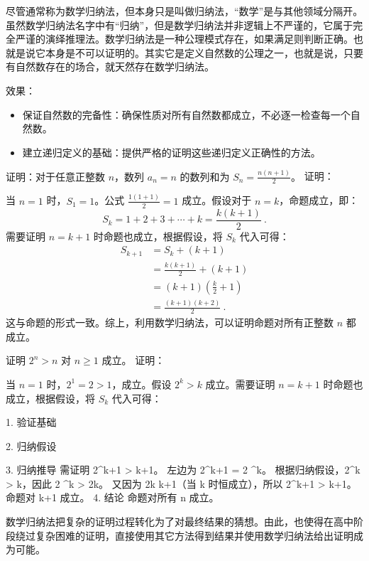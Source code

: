 尽管通常称为数学归纳法，但本身只是叫做归纳法，“数学”是与其他领域分隔开。虽然数学归纳法名字中有“归纳”，但是数学归纳法并非逻辑上不严谨的，它属于完全严谨的演绎推理法。数学归纳法是一种公理模式存在，如果满足则判断正确。也就是说它本身是不可以证明的。其实它是定义自然数的公理之一，也就是说，只要有自然数存在的场合，就天然存在数学归纳法。

效果：
\begin{itemize}
\item 保证自然数的完备性：确保性质对所有自然数都成立，不必逐一检查每一个自然数。
\item 建立递归定义的基础：提供严格的证明这些递归定义正确性的方法。
\end{itemize}

\begin{example}{证明：对于任意正整数 $n$，数列 $a_n=n$ 的数列和为 $S_n = \frac{n(n+1)}{2}$。}
证明：

当 $n = 1$ 时，$S_1 = 1$。公式 $\frac{1(1+1)}{2} = 1$ 成立。假设对于 $n = k$，命题成立，即：
\begin{equation}
S_k = 1 + 2 + 3 + \cdots + k = \frac{k(k+1)}{2}~.
\end{equation}
需要证明 $n = k+1$ 时命题也成立，根据假设，将 $S_k$ 代入可得：
\begin{equation}
\begin{aligned}
S_{k+1} &= S_k + (k+1)\\
&= \frac{k(k+1)}{2} + (k+1)\\
&= (k+1)\left(\frac{k}{2} +1\right)\\
&= \frac{(k+1)(k+2)}{2}~.
\end{aligned}
\end{equation}
这与命题的形式一致。综上，利用数学归纳法，可以证明命题对所有正整数 $n$ 都成立。
\end{example}

\begin{example}{证明 $2^n > n$ 对 $n \geq 1$ 成立。}
证明：

当 $n = 1$ 时，$2^1 = 2 > 1$，成立。假设 $2^k > k$ 成立。需要证明 $n = k+1$ 时命题也成立，根据假设，将 $S_k$ 代入可得：

\end{example}

	1.	验证基础

	2.	归纳假设

	3.	归纳推导
需证明 2^{k+1} > k+1。
左边为 2^{k+1} = 2 ^k。
根据归纳假设，2^k > k，因此 2 ^k > 2k。
又因为 2k \geq k+1（当 k  时恒成立），所以 2^{k+1} > k+1。
命题对 k+1 成立。
	4.	结论
命题对所有 n  成立。


数学归纳法把复杂的证明过程转化为了对最终结果的猜想。由此，也使得在高中阶段绕过复杂困难的证明，直接使用其它方法得到结果并使用数学归纳法给出证明成为可能。